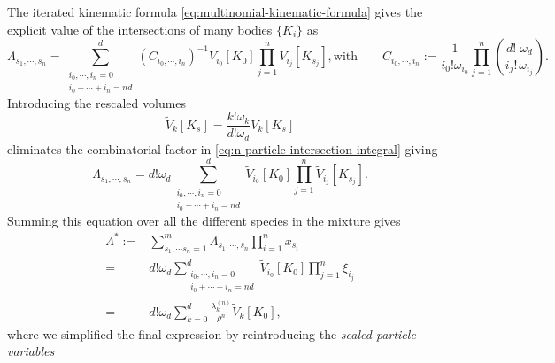 \documentclass[11pt,twoside]{report}
\begin{document}
The iterated kinematic formula \eqref{eq:multinomial-kinematic-formula} gives the explicit value of the intersections of many bodies $\{K_i\}$ as \cite{Santalo2004,MarechalPRE2014}
\begin{subequations}\label{eq:multinomial-kinematic-equation}
  \begin{equation}
    \Lambda_{s_1, \cdots, s_n}
    =
      \sum_{\substack{i_0, \cdots, i_n = 0 \\ i_0 + \cdots + i_n = nd}}^d
      (C_{i_0, \cdots, i_n})^{-1}
      V_{i_0}[K_0]
      \prod_{j=1}^n
      V_{i_j}[K_{s_j}],
  \end{equation}
  \begin{equation}
    \textrm{with} \qquad
    C_{i_0, \cdots, i_n}
    := \frac{1}{i_0! \omega_{i_0}}
    \prod_{j=1}^n
    \left(
    \frac{d!}{i_j!} \frac{\omega_d}{\omega_{i_j}}
    \right).
  \end{equation}
\end{subequations}
Introducing the rescaled volumes
\begin{equation}\label{eq:rescaled-intrinsic-volumes}
  \widetilde{V}_k[K_s]
  =
  \frac{k! \omega_k}{d! \omega_d} V_k[K_s]
\end{equation}
eliminates the combinatorial factor in \eqref{eq:n-particle-intersection-integral} giving
\begin{equation}\label{eq:lambda-reduced}
  \Lambda_{s_1, \cdots, s_n}
  =
  d! \omega_d
  \sum_{\substack{i_0, \cdots, i_n = 0 \\ i_0 + \cdots + i_n = nd}}^d
  \widetilde{V}_{i_0}[K_0]
  \prod_{j=1}^n
  \widetilde{V}_{i_j}[K_{s_j}].
\end{equation}
Summing this equation over all the different species in the mixture gives
\begin{equation}
  \label{eq:final-lambda}
  \begin{split}
    \Lambda^*
    :=&
    \sum_{s_1, \cdots s_n = 1}^m
    \Lambda_{s_1, \cdots, s_n}
    \prod_{i=1}^n x_{s_i}
    \\ =&
    d! \omega_d
    \sum_{\substack{i_0, \cdots, i_n = 0 \\ i_0 + \cdots + i_n = nd}}^d
    \widetilde{V}_{i_0}[K_0]
    \prod_{j=1}^n
    \xi_{i_j}
    \\ =&
    d! \omega_d
    \sum_{k = 0}^d
    \frac{\lambda_k^{(n)}}{\rho^n}
    \widetilde{V}_{k}[K_0],
  \end{split}
\end{equation}
where we simplified the final expression by reintroducing the \emph{scaled particle variables}%
\end{document}
